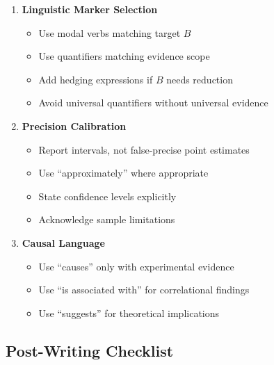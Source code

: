 \documentclass[11pt,a4paper]{article}
\begin{document}
\begin{enumerate}
    \item \textbf{Linguistic Marker Selection}
    \begin{itemize}
        \item[$\square$] Use modal verbs matching target $B$
        \item[$\square$] Use quantifiers matching evidence scope
        \item[$\square$] Add hedging expressions if $B$ needs reduction
        \item[$\square$] Avoid universal quantifiers without universal evidence
    \end{itemize}

    \item \textbf{Precision Calibration}
    \begin{itemize}
        \item[$\square$] Report intervals, not false-precise point estimates
        \item[$\square$] Use ``approximately'' where appropriate
        \item[$\square$] State confidence levels explicitly
        \item[$\square$] Acknowledge sample limitations
    \end{itemize}

    \item \textbf{Causal Language}
    \begin{itemize}
        \item[$\square$] Use ``causes'' only with experimental evidence
        \item[$\square$] Use ``is associated with'' for correlational findings
        \item[$\square$] Use ``suggests'' for theoretical implications
    \end{itemize}
\end{enumerate}

\subsection{Post-Writing Checklist}
\end{document}
